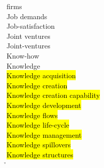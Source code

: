 \documentclass[a4paper]{article}
\begin{document}
\begin{multicols*}{2}
\begin{footnotesize}
 firms \\ Job demands \\ Job-satisfaction \\ Joint ventures \\ Joint-ventures \\ Know-how \\ Knowledge \\ \hl{Knowledge acquisition} \\ \hl{Knowledge creation} \\ \hl{Knowledge creation capability} \\ \hl{Knowledge development} \\ \hl{Knowledge flows} \\ \hl{Knowledge life-cycle} \\ \hl{Knowledge management} \\ \hl{Knowledge spillovers} \\ \hl{Knowledge structures} \\ \h
\end{footnotesize}
\end{multicols*}
\end{document}
